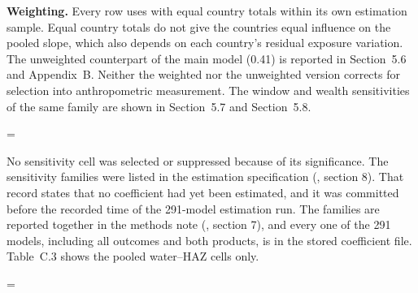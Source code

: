 \par\endgroup

\textbf{Weighting.} Every row uses  with equal country totals within its own estimation sample. Equal country totals do not give the countries equal influence on the pooled slope, which also depends on each country's residual exposure variation. The unweighted counterpart of the main model (0.41) is reported in Section~5.6 and Appendix~B. Neither the weighted nor the unweighted version corrects for selection into anthropometric measurement. The window and wealth sensitivities of the same family are shown in Section~5.7 and Section~5.8.

\begingroup\edef\ThesisSavedIndent{\the\parindent}\raggedright\parindent=\ThesisSavedIndent\relax{}

No sensitivity cell was selected or suppressed because of its significance. The sensitivity families were listed in the estimation specification (, section 8). That record states that no coefficient had yet been estimated, and it was committed before the recorded time of the 291-model estimation run. The families are reported together in the methods note (, section 7), and every one of the 291 models, including all outcomes and both products, is in the stored coefficient file. Table~C.3 shows the pooled water--HAZ cells only.

\par\endgroup

\begingroup\edef\ThesisSavedIndent{\the\parindent}\raggedright\parindent=\ThesisSavedIndent\relax{}

